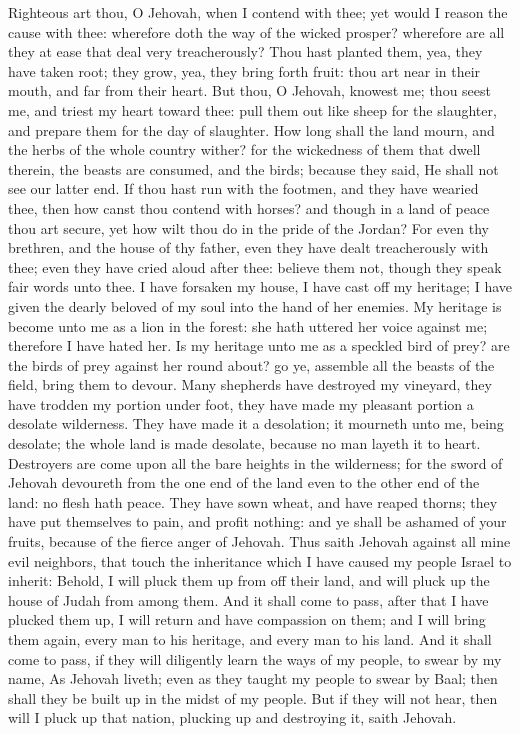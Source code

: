 Righteous art thou, O Jehovah, when I contend with thee; yet would I reason the cause with thee: wherefore doth the way of the wicked prosper? wherefore are all they at ease that deal very treacherously? Thou hast planted them, yea, they have taken root; they grow, yea, they bring forth fruit: thou art near in their mouth, and far from their heart. But thou, O Jehovah, knowest me; thou seest me, and triest my heart toward thee: pull them out like sheep for the slaughter, and prepare them for the day of slaughter. How long shall the land mourn, and the herbs of the whole country wither? for the wickedness of them that dwell therein, the beasts are consumed, and the birds; because they said, He shall not see our latter end.  If thou hast run with the footmen, and they have wearied thee, then how canst thou contend with horses? and though in a land of peace thou art secure, yet how wilt thou do in the pride of the Jordan? For even thy brethren, and the house of thy father, even they have dealt treacherously with thee; even they have cried aloud after thee: believe them not, though they speak fair words unto thee.  I have forsaken my house, I have cast off my heritage; I have given the dearly beloved of my soul into the hand of her enemies. My heritage is become unto me as a lion in the forest: she hath uttered her voice against me; therefore I have hated her. Is my heritage unto me as a speckled bird of prey? are the birds of prey against her round about? go ye, assemble all the beasts of the field, bring them to devour. Many shepherds have destroyed my vineyard, they have trodden my portion under foot, they have made my pleasant portion a desolate wilderness. They have made it a desolation; it mourneth unto me, being desolate; the whole land is made desolate, because no man layeth it to heart. Destroyers are come upon all the bare heights in the wilderness; for the sword of Jehovah devoureth from the one end of the land even to the other end of the land: no flesh hath peace. They have sown wheat, and have reaped thorns; they have put themselves to pain, and profit nothing: and ye shall be ashamed of your fruits, because of the fierce anger of Jehovah.  Thus saith Jehovah against all mine evil neighbors, that touch the inheritance which I have caused my people Israel to inherit: Behold, I will pluck them up from off their land, and will pluck up the house of Judah from among them. And it shall come to pass, after that I have plucked them up, I will return and have compassion on them; and I will bring them again, every man to his heritage, and every man to his land. And it shall come to pass, if they will diligently learn the ways of my people, to swear by my name, As Jehovah liveth; even as they taught my people to swear by Baal; then shall they be built up in the midst of my people. But if they will not hear, then will I pluck up that nation, plucking up and destroying it, saith Jehovah. 

